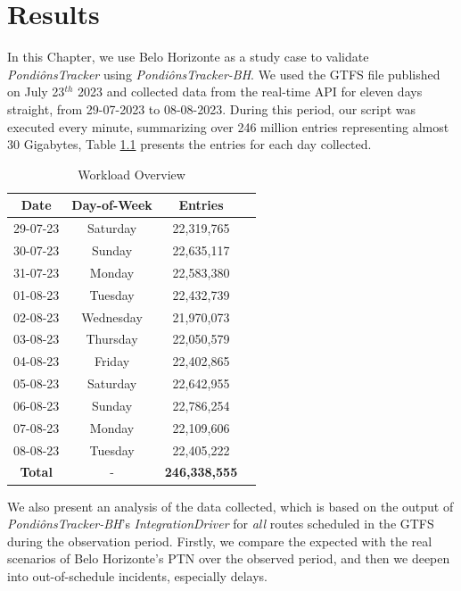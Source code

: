 \chapter{Results}
\label{cap5}

\vspace{-1.9cm}


In this Chapter, we use Belo Horizonte as a study case to validate \textit{PondiônsTracker} using
\textit{PondiônsTracker-BH}. We used the GTFS file published on July 23${^{th}}$ 2023 and collected
data from the real-time API for eleven days straight, from 29-07-2023 to 08-08-2023.
During this period, our script was executed every minute, summarizing over 246 million entries 
representing almost 30 Gigabytes, Table \ref{tab:entries} presents the entries for each day collected.

\begin{table}[h]
\centering
\caption{Workload Overview } 
\begin{tabular}{ |c|c|c|l| } 
\hline
Date & Day-of-Week & Entries \\
\hline
29-07-23& Saturday & 22,319,765 \\ 
\hline
30-07-23& Sunday & 22,635,117 \\ 
\hline
31-07-23& Monday & 22,583,380 \\ 
\hline
01-08-23& Tuesday & 22,432,739 \\ 
\hline
02-08-23& Wednesday & 21,970,073 \\ 
\hline
03-08-23& Thursday & 22,050,579 \\ 
\hline
04-08-23& Friday & 22,402,865 \\ 
\hline
05-08-23& Saturday & 22,642,955 \\ 
\hline
06-08-23& Sunday & 22,786,254 \\ 
\hline
07-08-23& Monday & 22,109,606 \\ 
\hline
08-08-23& Tuesday & 22,405,222 \\ 
\hline
\textbf{Total}& - & \textbf{246,338,555} \\ 
\hline
\end{tabular}
\label{tab:entries}
\end{table}


We also present an analysis of the data collected, which is based on the output of 
\textit{PondiônsTracker-BH}'s \textit{IntegrationDriver} for {\em all} routes scheduled in
the GTFS during the observation period. Firstly, we compare the expected with the real scenarios of Belo Horizonte's PTN over the observed period, and then we deepen into out-of-schedule incidents, especially delays.


